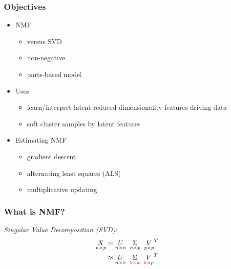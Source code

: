 \documentclass[xcolor={dvipsnames}]{beamer}
\begin{document}
\frame
{
\frametitle{Objectives}

\LARGE 
\begin{itemize}
\item NMF 
\begin{itemize}
\Large
\item versus SVD
\item non-negative 
\item parts-based model 
\end{itemize}
\item Uses 
\begin{itemize}
\Large
\item learn/interpret latent reduced dimensionality features driving data 
\item soft cluster samples by latent features
\end{itemize}
\item Estimating NMF
\begin{itemize}
\Large
\item gradient descent
\item alternating least squares (ALS)
\item multiplicative updating
\end{itemize}

\end{itemize}

}


\frame
{
\frametitle{What is NMF?}


\emph{Singular Value Decomposition (SVD)}: 
\LARGE
\begin{align*} %
\underset{n\times p}{X}  = {}& \underset{n\times n}{U}\;\;\underset{n\times p}{\Sigma} \;\; \underset{p\times p}{V}^T \\
\approx {}&\underset{n\times \textcolor{red}{k}}{U}\;\;\underset{\textcolor{red}{k \times k}}{\Sigma} \;\; \underset{\textcolor{red}{k}\times p}{V}^T 
\end{align*}


\normalsize
\vspace{-.75em}
\vspace{.25em}
}
\end{document}
